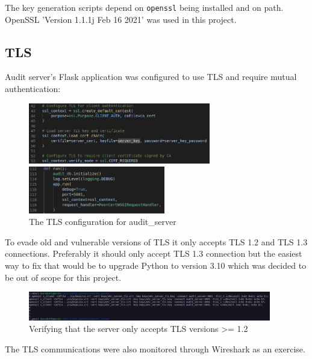 \documentclass[11pt]{article}
\begin{document}
\begin{flushleft}
The key generation scripts depend on \verb+openssl+ being installed and on path. OpenSSL 'Version 1.1.1j  Feb 16 2021' was used in this project.

\subsection{TLS}

Audit server's Flask application was configured to use TLS and require mutual authentication:

\begin{figure}[h!]
	\begin{center}
		\includegraphics[width = 300px]{images/server_tls.png}
		
		\vspace{2mm}
		
		\includegraphics[width = 225px]{images/server_ssl_2.png}
		\caption{The TLS configuration for audit\_server}
	\end{center}
\end{figure}

To evade old and vulnerable versions of TLS it only accepts TLS 1.2 and TLS 1.3 connections. Preferably it should only accept TLS 1.3 connection but the easiest way to fix that would be to upgrade Python to version 3.10 which was decided to be out of scope for this project.


\begin{figure}[h!]
	\begin{center}
		\includegraphics[width = 400px]{images/tls_version_verify.png}
		\caption{Verifying that the server only accepts TLS versions >= 1.2}
	\end{center}
\end{figure}

The TLS communications were also monitored through Wireshark as an exercise.


\end{flushleft}
\end{document}
